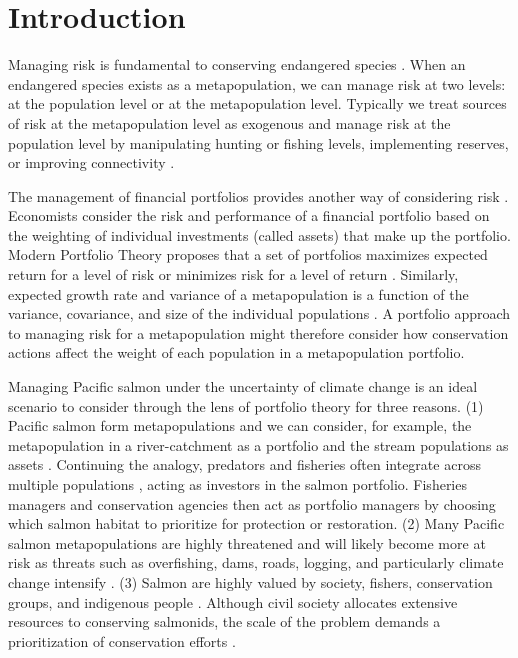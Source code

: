 \section{Introduction}

Managing risk is fundamental to conserving endangered species \citep{burgman2005, iucn2009}. When an endangered species exists as a metapopulation, we can manage risk at two levels: at the population level or at the metapopulation level. Typically we treat sources of risk at the metapopulation level as exogenous and manage risk at the population level by manipulating hunting or fishing levels, implementing reserves, or improving connectivity \citep[e.g.][]{akcakaya2007}.

The management of financial portfolios provides another way of considering risk \citep{figge2004, koellner2006, ando2012}. Economists consider the risk and performance of a financial portfolio based on the weighting of individual investments (called assets) that make up the portfolio. Modern Portfolio Theory proposes that a set of portfolios maximizes expected return for a level of risk or minimizes risk for a level of return \citep{markowitz1952, markowitz1959}. Similarly, expected growth rate and variance of a metapopulation is a function of the variance, covariance, and size of the individual populations \citep{moore2010}. A portfolio approach to managing risk for a metapopulation might therefore consider how conservation actions affect the weight of each population in a metapopulation portfolio.

Managing Pacific salmon under the uncertainty of climate change is an ideal scenario to consider through the lens of portfolio theory for three reasons. (1) Pacific salmon form metapopulations \citep{rieman2000, schtickzelle2007} and we can consider, for example, the metapopulation in a river-catchment as a portfolio and the stream populations as assets \citep{schindler2010, moore2010}. Continuing the analogy, predators and fisheries often integrate across multiple populations \citep{hilborn2003, schindler2008}, acting as investors in the salmon portfolio. Fisheries managers and conservation agencies then act as portfolio managers by choosing which salmon habitat to prioritize for protection or restoration. (2) Many Pacific salmon metapopulations are highly threatened \citep{mcclure2003, gustafson2007, peterman2012} and will likely become more at risk as threats such as overfishing, dams, roads, logging, and particularly climate change intensify \citep[e.g.][]{lackey2003}. (3) Salmon are highly valued by society, fishers, conservation groups, and indigenous people \citep{nrc1996}. Although civil society allocates extensive resources to conserving salmonids, the scale of the problem demands a prioritization of conservation efforts \citep{allendorf1997}.


